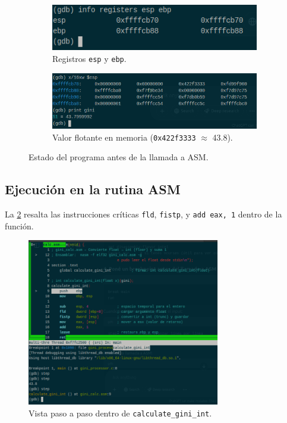 \documentclass[a4paper,12pt]{article}
\begin{document}
\begin{figure}[H]
  \centering
  \begin{subfigure}{0.48\textwidth}
    \includegraphics[width=\linewidth]{beforeasm.png}
    \caption{Registros \texttt{esp} y \texttt{ebp}.}
  \end{subfigure}
  \hfill
  \begin{subfigure}{0.48\textwidth}
    \includegraphics[width=\linewidth]{beforeasm2.png}
    \caption{Valor flotante en memoria (\texttt{0x422f3333} $\approx$ 43.8).}
  \end{subfigure}
  \caption{Estado del programa antes de la llamada a ASM.}
  \label{fig:before}
\end{figure}

\subsection{Ejecución en la rutina ASM}
La \cref{fig:asm} resalta las instrucciones críticas \texttt{fld},
\texttt{fistp}, y \texttt{add eax,\,1} dentro de la función.

\begin{figure}[H]
  \centering
  \includegraphics[width=0.75\textwidth]{calculategini.png}
  \caption{Vista paso a paso dentro de \texttt{calculate\_gini\_int}.}
  \label{fig:asm}
\end{figure}
\end{document}
